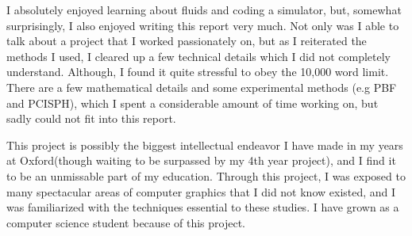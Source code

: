 I absolutely enjoyed learning about fluids and coding a simulator, but, somewhat surprisingly, I also enjoyed writing this report very much. Not only was I able to talk about a project that I worked passionately on, but as I reiterated the methods I used, I cleared up a few technical details which I did not completely understand. Although, I found it quite stressful to obey the 10,000 word limit. There are a few mathematical details and some experimental methods (e.g PBF and PCISPH), which I spent a considerable amount of time working on, but sadly could not fit into this report.

This project is possibly the biggest intellectual endeavor I have made in my years at Oxford(though waiting to be surpassed by my 4th year project), and I find it to be an unmissable part of my education. Through this project, I was exposed to many spectacular areas of computer graphics that I did not know existed, and I was familiarized with the techniques essential to these studies. I have grown as a computer science student because of this project.